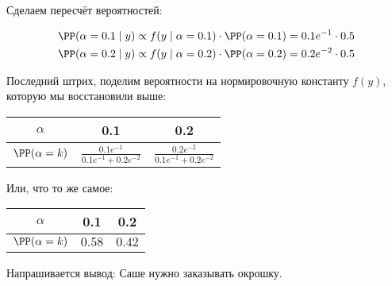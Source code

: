 \begin{problem}
\begin{sol}
		
		Сделаем пересчёт вероятностей: 
		
		\begin{equation*}
		\begin{aligned}
		\PP(\alpha = 0.1 \mid y) \propto f(y \mid \alpha = 0.1) \cdot \PP(\alpha = 0.1) = 0.1 e^{-1} \cdot 0.5 \\ 
		\PP(\alpha = 0.2 \mid y) \propto  f(y \mid \alpha = 0.2) \cdot \PP(\alpha = 0.2) = 0.2 e^{-2} \cdot 0.5\\
		\end{aligned}
		\end{equation*}
		
		Последний штрих, поделим вероятности на нормировочную константу $f(y)$, которую мы восстановили выше:
		
		\begin{center}
			\begin{tabular}{c|c|c}
				$\alpha$ & 0.1 & 0.2 \\ \hline
				$\PP(\alpha= k)$ & $\frac{0.1 e^{-1}}{0.1 e^{-1} + 0.2 e^{-2}}$ & $\frac{0.2 e^{-2}}{0.1 e^{-1} + 0.2 e^{-2}}$ \\ 
			\end{tabular}
		\end{center}
		
		Или, что то же самое: 
		
		\begin{center}
			\begin{tabular}{c|c|c}
				$\alpha$ & 0.1 & 0.2 \\ \hline
				$\PP(\alpha= k)$ & $0.58$ & $0.42$ \\ 
			\end{tabular}
		\end{center}
		
		Напрашивается вывод: Саше нужно заказывать окрошку.  
		
	\end{sol}
\end{problem}


